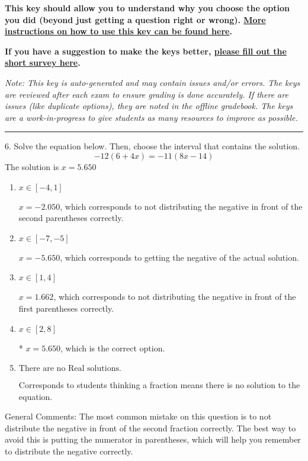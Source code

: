 \documentclass{extbook}[14pt]
\begin{document}
\textbf{This key should allow you to understand why you choose the option you did (beyond just getting a question right or wrong). \href{https://xronos.clas.ufl.edu/mac1105spring2020/courseDescriptionAndMisc/Exams/LearningFromResults}{More instructions on how to use this key can be found here}.}

\textbf{If you have a suggestion to make the keys better, \href{https://forms.gle/CZkbZmPbC9XALEE88}{please fill out the short survey here}.}

\textit{Note: This key is auto-generated and may contain issues and/or errors. The keys are reviewed after each exam to ensure grading is done accurately. If there are issues (like duplicate options), they are noted in the offline gradebook. The keys are a work-in-progress to give students as many resources to improve as possible.}

\rule{\textwidth}{0.4pt}

6. Solve the equation below. Then, choose the interval that contains the solution.
\[ -12(6+4 x) = -11(8 x-14) \] 
The solution is $ x = 5.650 $ 

\begin{enumerate}[label=\Alph*.] 
\item $ x \in [-4, 1] $ 

  $x = -2.050$, which corresponds to not distributing the negative in front of the second parentheses correctly. 
\item $ x \in [-7, -5] $ 

  $x = -5.650$, which corresponds to getting the negative of the actual solution. 
\item $ x \in [1, 4] $ 

  $x = 1.662$, which corresponds to not distributing the negative in front of the first parentheses correctly. 
\item $ x \in [2, 8] $ 

 * $x = 5.650$, which is the correct option. 
\item $ \text{There are no Real solutions. } $ 

 Corresponds to students thinking a fraction means there is no solution to the equation. 
\end{enumerate} 
 
General Comments: The most common mistake on this question is to not distribute the negative in front of the second fraction correctly. The best way to avoid this is putting the numerator in parentheses, which will help you remember to distribute the negative correctly.
\end{document}
